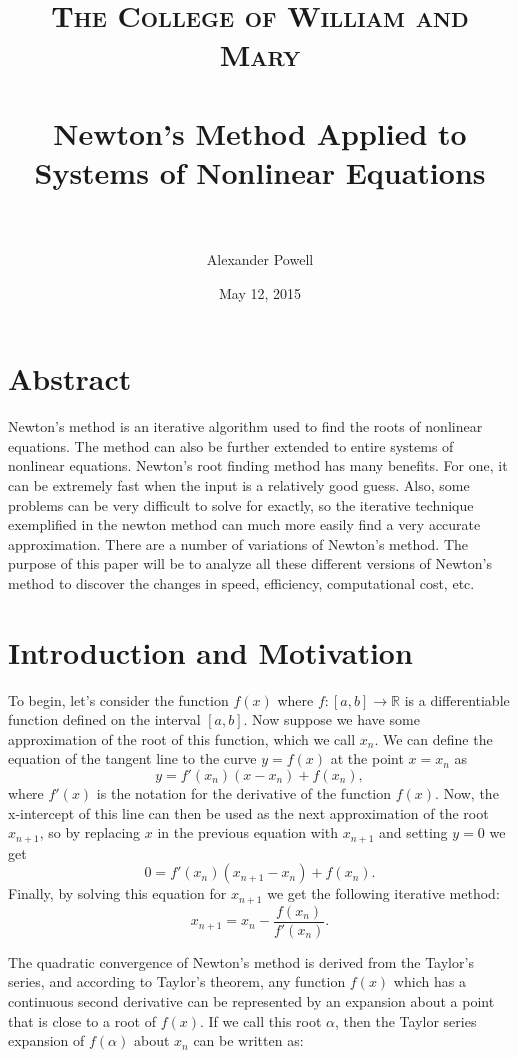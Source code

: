 \documentclass[paper=a4, fontsize=11pt]{scrartcl} %
\title{	
\normalfont \normalsize 
\textsc{The College of William and Mary} \\ [25pt] %
\horrule{0.5pt} \\[0.4cm] %
\huge Newton's Method Applied to Systems of Nonlinear Equations \\ %
\horrule{2pt} \\[0.5cm] %
}
\author{Alexander Powell} %
\date{\normalsize May 12, 2015} %
\numberwithin{equation}{section} %
\numberwithin{figure}{section} %
\numberwithin{table}{section} %
\begin{document}
\lstset{language=MATLAB}
\maketitle %

\theoremstyle{definition}
\newtheorem{exmp}{Example}[section]

\theoremstyle{definition}
\newtheorem{definition}{Definition}[section]



\section{Abstract}
Newton's method is an iterative algorithm used to find the roots of nonlinear equations.  The method can also be further extended to entire systems of nonlinear equations.  Newton's root finding method has many benefits.  For one, it can be extremely fast when the input is a relatively good guess.  Also, some problems can be very difficult to solve for exactly, so the iterative technique exemplified in the newton method can much more easily find a very accurate approximation.  There are a number of variations of Newton's method.  The purpose of this paper will be to analyze all these different versions of Newton's method to discover the changes in speed, efficiency, computational cost, etc.  

\section{Introduction and Motivation}

To begin, let's consider the function $f(x)$ where $f : [a,b] \rightarrow \mathbb{R}$ is a differentiable function defined on the interval $[a,b]$.  Now suppose we have some approximation of the root of this function, which we call $x_n$.  We can define the equation of the tangent line to the curve $y=f(x)$ at the point $x = x_n$ as 
$$ y = f'(x_n)(x - x_n) + f(x_n), $$
where $f'(x)$ is the notation for the derivative of the function $f(x)$.  Now, the x-intercept of this line can then be used as the next approximation of the root $x_{n+1}$, so by replacing $x$ in the previous equation with $x_{n+1}$ and setting $y=0$ we get 
$$ 0 = f'(x_n)(x_{n+1}-x_n) + f(x_n). $$
Finally, by solving this equation for $x_{n+1}$ we get the following iterative method:
$$ x_{n+1} = x_n - \frac{f(x_n)}{f'(x_n)}. $$

The quadratic convergence of Newton's method is derived from the Taylor's series, and according to Taylor's theorem, any function $f(x)$ which has a continuous second derivative can be represented by an expansion about a point that is close to a root of $f(x)$.  If we call this root $\alpha$, then the Taylor series expansion of $f(\alpha)$ about $x_n$ can be written as:
\end{document}
